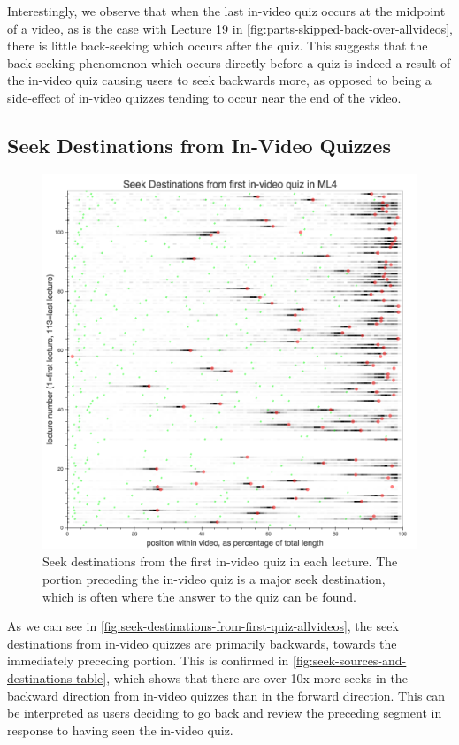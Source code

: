\documentclass{sigchi}
\begin{document}
Interestingly, we observe that when the last in-video quiz occurs at the midpoint of a video, as is the case with Lecture 19 in \autoref{fig:parts-skipped-back-over-allvideos}, there is little back-seeking which occurs after the quiz. This suggests that the back-seeking phenomenon which occurs directly before a quiz is indeed a result of the in-video quiz causing users to seek backwards more, as opposed to being a side-effect of in-video quizzes tending to occur near the end of the video.


\subsection{Seek Destinations from In-Video Quizzes}

\begin{figure}
\includegraphics[width=1.0\columnwidth]{seek-destinations-from-first-quiz-allvideos}
\caption{Seek destinations from the first in-video quiz in each lecture. The portion preceding the in-video quiz is a major seek destination, which is often where the answer to the quiz can be found.}
\label{fig:seek-destinations-from-first-quiz-allvideos}
\end{figure}

As we can see in \autoref{fig:seek-destinations-from-first-quiz-allvideos}, the seek destinations from in-video quizzes are primarily backwards, towards the immediately preceding portion. This is confirmed in \autoref{fig:seek-sources-and-destinations-table}, which shows that there are over 10x more seeks in the backward direction from in-video quizzes than in the forward direction. This can be interpreted as users deciding to go back and review the preceding segment in response to having seen the in-video quiz.
\end{document}
